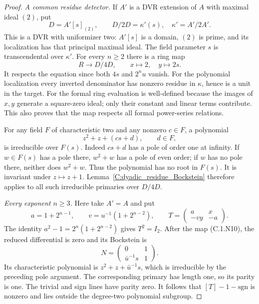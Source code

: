 \begin{proof}
\emph{A common residue detector.}
If $A'$ is a DVR extension of $A$ with maximal ideal $(2)$,
put
\[
                 D=A'[s]_{(2)},\qquad
                 D/2D=\kappa'(s),\quad \kappa'=A'/2A'.  \tag{C.1.N9}
\]
This is a DVR with uniformizer two: $A'[s]$ is a domain,
$(2)$ is prime, and its localization has that principal maximal
ideal. The field parameter $s$ is transcendental over $\kappa'$.
For every $n\ge2$ there is a ring map
\[
                    R\longrightarrow D/4D,
                         \qquad x\mapsto2,\quad y\mapsto2s.
                                                               \tag{C.1.N10}
\]
It respects the equation since both $4s$ and $2^nu$ vanish.
For the polynomial localization every inverted denominator has
nonzero residue in $\kappa$, hence is a unit in the target.
For the formal ring evaluation is well-defined because the images
of $x,y$ generate a square-zero ideal; only their constant and
linear terms contribute. This also proves that the map respects
all formal power-series relations.

For any field $F$ of characteristic two and any nonzero $c\in F$,
a polynomial
\[
                       z^2+z+(cs+d),\qquad d\in F,
\]
is irreducible over $F(s)$. Indeed $cs+d$ has a pole of order
one at infinity. If $w\in F(s)$ has a pole there, $w^2+w$
has a pole of even order; if $w$ has no pole there, neither
does $w^2+w$. Thus the polynomial has no root in $F(s)$.
It is invariant under $z\mapsto z+1$.
Lemma~\ref{C:dyadic_residue_Bockstein} therefore applies to
all such irreducible primaries over $D/4D$.

\emph{Every exponent $n\ge3$.}
Here take $A'=A$ and put
\[
 a=1+2^{n-1},\qquad v=u^{-1}(1+2^{n-2}),\qquad
 T=\begin{pmatrix}a&x\\-vy&-a\end{pmatrix}.             \tag{C.1.N11}
\]
The identity $a^2-1=2^n(1+2^{n-2})$ gives $T^2=I_2$.
After the map (C.1.N10), the reduced differential is zero and
its Bockstein is
\[
             N=\begin{pmatrix}0&1\\\bar u^{-1}s&1\end{pmatrix}.
\]
Its characteristic polynomial is $z^2+z+\bar u^{-1}s$,
which is irreducible by the preceding pole argument.
The corresponding primary has length one, so its parity is one.
The trivial and sign lines have parity zero.
It follows that $[T]-1-\mathrm{sgn}$ is nonzero and lies outside
the degree-two polynomial subgroup.


\end{proof}

